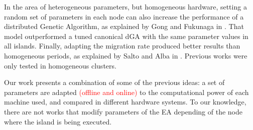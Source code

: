 \documentclass[final,1p,times]{elsarticle}
\begin{document}
In the area of heterogeneous parameters, but homogeneous hardware, setting a random set of parameters in each node can also increase the performance of a distributed Genetic Algorithm, as explained by Gong and Fukunaga in \cite{HETEROGENEOUSPARAMETERS}. That model outperformed a tuned canonical dGA with the same parameter values in all islands. Finally, adapting the migration rate produced better results than homogeneous periods, as explained by Salto and Alba in \cite{HETEROGENEOUSMIGRATION}. Previous works were only tested in homogeneous clusters.

 Our work presents a combination of some of the previous ideas: a set of parameters are adapted \textcolor{red}{(offline and online)} to the computational power of each machine used, and compared in different hardware systems.
 To our knowledge, there are not works that
 modify parameters of the EA depending of the
 node where the island is being executed. 






\end{document}
